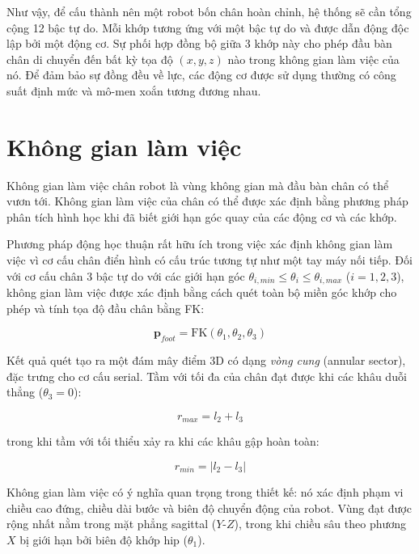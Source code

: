Như vậy, để cấu thành nên một robot bốn chân hoàn chỉnh, hệ thống sẽ cần tổng cộng 12 bậc tự do. Mỗi khớp tương ứng với một bậc tự do và được dẫn động độc lập bởi một động cơ. Sự phối hợp đồng bộ giữa 3 khớp này cho phép đầu bàn chân di chuyển đến bất kỳ tọa độ $(x, y, z)$ nào trong không gian làm việc của nó. Để đảm bảo sự đồng đều về lực, các động cơ được sử dụng thường có công suất định mức và mô-men xoắn tương đương nhau.

\section{Không gian làm việc }
Không gian làm việc chân robot là vùng không gian mà đầu bàn chân có thể vươn tới. Không gian làm việc của chân có thể được xác định bằng phương pháp phân tích hình học khi đã biết giới hạn góc quay của các động cơ và các khớp.

Phương pháp động học thuận rất hữu ích trong việc xác định không gian làm việc vì cơ cấu chân điển hình có cấu trúc tương tự như một tay máy nối tiếp. Đối với cơ cấu chân 3 bậc tự do với các giới hạn góc $\theta_{i,min} \leq \theta_i \leq \theta_{i,max}$ ($i = 1, 2, 3$), không gian làm việc được xác định bằng cách quét toàn bộ miền góc khớp cho phép và tính tọa độ đầu chân bằng FK:

\begin{equation}
    \mathbf{p}_{foot} = \text{FK}(\theta_1, \theta_2, \theta_3)
\end{equation}

Kết quả quét tạo ra một đám mây điểm 3D có dạng \textit{vòng cung} (annular sector), đặc trưng cho cơ cấu serial. Tầm với tối đa của chân đạt được khi các khâu duỗi thẳng ($\theta_3 = 0$):

\begin{equation}
    r_{max} = l_2 + l_3
\end{equation}

trong khi tầm với tối thiểu xảy ra khi các khâu gập hoàn toàn:

\begin{equation}
    r_{min} = |l_2 - l_3|
\end{equation}

Không gian làm việc có ý nghĩa quan trọng trong thiết kế: nó xác định phạm vi chiều cao đứng, chiều dài bước và biên độ chuyển động của robot. Vùng đạt được rộng nhất nằm trong mặt phẳng sagittal ($Y$-$Z$), trong khi chiều sâu theo phương $X$ bị giới hạn bởi biên độ khớp hip ($\theta_1$).



